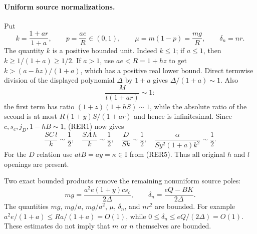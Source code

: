 \paragraph{Uniform source normalizations.}
Put
\[
 k=\frac{1+ar}{1+a},\qquad p=\frac{ae}{R}\in(0,1),
 \qquad \mu=m(1-p)=\frac{mg}{R},\qquad\delta_n=nr.
\]
The quantity $k$ is a positive bounded unit.  Indeed $k\leq1$; if
$a\leq1$, then $k\geq1/(1+a)\geq1/2$.  If $a>1$, use
$ae<R=1+hz$ to get $k>(a-hz)/(1+a)$, which has a positive real lower
bound.  Direct termwise division of the displayed polynomial
$\Delta$ by $1+a$ gives $\Delta/(1+a)\sim1$.  Also
\[
 \frac{M}{t(1+ar)}\sim1:
\]
the first term has ratio $(1+z)(1+hS)\sim1$, while the absolute
ratio of the second is at most $R(1+y)S/(1+ar)$ and hence is
infinitesimal.  Since $c,s_c,j_D,1-hB\sim1$, (RER1) now gives
\[
 \frac{SC\,l}{k}\sim\frac12,\quad
 \frac{SA\,h}{k}\sim\frac12,\quad
 \frac{D}{Sk}\sim\frac12,\quad
 \frac{\alpha}{Sy^2(1+a)k^2}\sim\frac12.               \tag{RER6}
\]
For the $D$ relation use $atB=ay=\kappa\in\mathrm I$ from
(RER5).  Thus all original $h$ and $l$ openings are present.

Two exact bounded products remove the remaining nonuniform source
poles:
\[
 mg=\frac{a^2e(1+y)c s_c}{2\Delta},\qquad
 \delta_n=\frac{eQ-BK}{2\Delta}.                       \tag{RER7}
\]
The quantities $mg$, $mg/a$, $mg/a^2$, $\mu$, $\delta_n$, and
$nr^2$ are bounded.  For example
$a^2e/(1+a)\leq R a/(1+a)=O(1)$, while
$0\leq\delta_n\leq eQ/(2\Delta)=O(1)$.
These estimates do not imply that $m$ or $n$ themselves are bounded.

